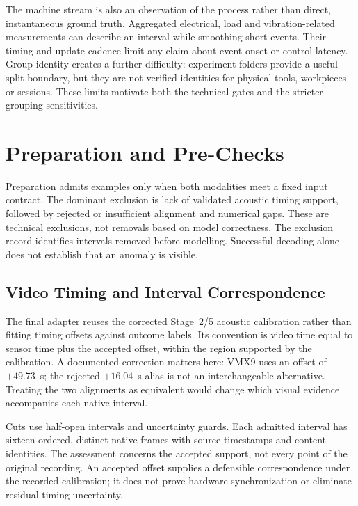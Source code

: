 The machine stream is also an observation of the process rather than direct, instantaneous ground truth. Aggregated electrical, load and vibration-related measurements can describe an interval while smoothing short events. Their timing and update cadence limit any claim about event onset or control latency. Group identity creates a further difficulty: experiment folders provide a useful split boundary, but they are not verified identities for physical tools, workpieces or sessions. These limits motivate both the technical gates and the stricter grouping sensitivities.

\section{Preparation and Pre-Checks}
Preparation admits examples only when both modalities meet a fixed input contract. The dominant exclusion is lack of validated acoustic timing support, followed by rejected or insufficient alignment and numerical gaps. These are technical exclusions, not removals based on model correctness. The exclusion record identifies intervals removed before modelling. Successful decoding alone does not establish that an anomaly is visible.

\subsection{Video Timing and Interval Correspondence}
The final adapter reuses the corrected Stage~2/5 acoustic calibration rather than fitting timing offsets against outcome labels. Its convention is video time equal to sensor time plus the accepted offset, within the region supported by the calibration. A documented correction matters here: VMX9 uses an offset of $+49.73$~s; the rejected $+16.04$~s alias is not an interchangeable alternative. Treating the two alignments as equivalent would change which visual evidence accompanies each native interval.

Cuts use half-open intervals and uncertainty guards. Each admitted interval has sixteen ordered, distinct native frames with source timestamps and content identities. The assessment concerns the accepted support, not every point of the original recording. An accepted offset supplies a defensible correspondence under the recorded calibration; it does not prove hardware synchronization or eliminate residual timing uncertainty.

